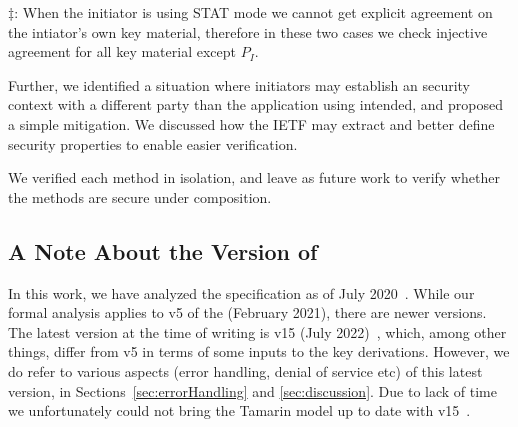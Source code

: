\documentclass[runningheads]{llncs}
\begin{document}
\begin{table*}[t]
{            $\ddagger$: When the initiator is using STAT mode we
            cannot get explicit agreement on the intiator's own key
            material, therefore in these two cases we check injective
            agreement for all key material except $P_I$.\\
          }
                    \label{tab:props}
\end{table*}

Further, we identified a situation where initiators may establish an 
\mOscore{}
security context with a different party than the application using \mEdhoc{}
intended, and proposed a simple mitigation.
%
We discussed how the IETF may extract and better define security properties 
to
enable easier verification.

We verified each method in isolation, and leave as future work to verify 
whether
the methods are secure under composition.

\subsection{A Note About the Version of \mEdhoc}
\label{sec:newdrafts}
In this work, we have analyzed the \mEdhoc{} specification as of July
2020~\cite{our-analysis-selander-lake-edhoc-00}.
%
While our formal analysis applies to v5 of the \mSpec{} (February 2021),
there are newer versions.
%
The latest version at the time of writing is
v15 (July 2022)~\cite{draft-ietf-lake-edhoc-15}, which, among other things,
differ from v5 in terms of some inputs to the key derivations.
%
However, we do refer to various aspects
(error handling, denial of service etc) of this latest version,
in Sections~\ref{sec:errorHandling} and \ref{sec:discussion}.
%
Due to lack of time we unfortunately could not bring the Tamarin model up to
date with v15~\cite{draft-ietf-lake-edhoc-15}.
%
\end{document}
